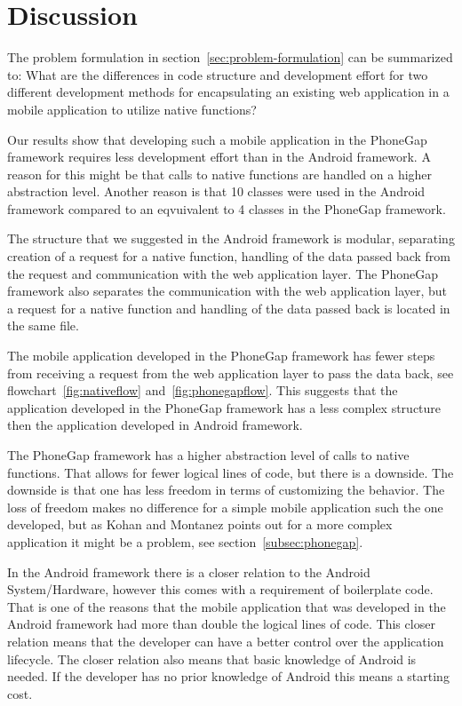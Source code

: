 \chapter{Discussion} \label{ch:discussion}
The problem formulation in section~\ref{sec:problem-formulation} can be summarized to:
What are the differences in code structure and development effort for two different development methods for encapsulating an existing web application in a mobile application to utilize native functions?

Our results show that developing such a mobile application in the PhoneGap framework requires less development effort than in the Android framework. A reason for this might be that calls to native functions are handled on a higher abstraction level. Another reason is that 10 classes were used in the Android framework compared to an eqvuivalent to 4 classes in the PhoneGap framework.

The structure that we suggested in the Android framework is modular, separating creation of a request for a native function, handling of the data passed back from the request and communication with the web application layer. The PhoneGap framework also separates the communication with the web application layer, but a request for a native function and handling of the data passed back is located in the same file. 

The mobile application developed in the PhoneGap framework has fewer steps from receiving a request from the web application layer to pass the data back, see flowchart~\ref{fig:nativeflow} and~\ref{fig:phonegapflow}. This suggests that the application developed in the PhoneGap framework has a less complex structure then the application developed in Android framework.

The PhoneGap framework has a higher abstraction level of calls to native functions. That allows for fewer logical lines of code, but there is a downside. The downside is that one has less freedom in terms of customizing the behavior. The loss of freedom makes no difference for a simple mobile application such the one developed, but as Kohan and Montanez points out for a more complex application it might be a problem, see section~\ref{subsec:phonegap}. 

In the Android framework there is a closer relation to the Android System/Hardware, however this comes with a requirement of boilerplate code. That is one of the reasons that the mobile application that was developed in the Android framework had more than double the logical lines of code. This closer relation means that the developer can have a better control over the application lifecycle. The closer relation also means that basic knowledge of Android is needed. If the developer has no prior knowledge of Android this means a starting cost. 

